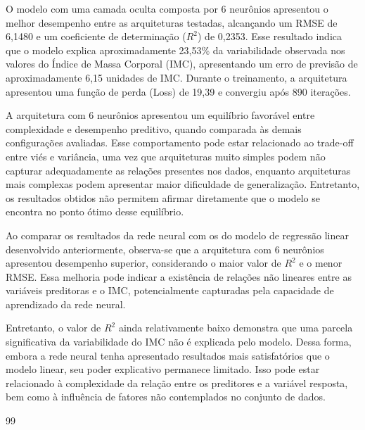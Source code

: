 \documentclass[conference]{IEEEtran}
\begin{document}
O modelo com uma camada oculta composta por 6 neurônios apresentou o melhor desempenho entre as arquiteturas testadas, alcançando um RMSE de 6,1480 e um coeficiente de determinação ($R^2$) de 0,2353. Esse resultado indica que o modelo explica aproximadamente 23,53\% da variabilidade observada nos valores do Índice de Massa Corporal (IMC), apresentando um erro de previsão de aproximadamente 6,15 unidades de IMC. Durante o treinamento, a arquitetura apresentou uma função de perda (Loss) de 19,39 e convergiu após 890 iterações.

A arquitetura com 6 neurônios apresentou um equilíbrio favorável entre complexidade e desempenho preditivo, quando comparada às demais configurações avaliadas. Esse comportamento pode estar relacionado ao trade-off entre viés e variância, uma vez que arquiteturas muito simples podem não capturar adequadamente as relações presentes nos dados, enquanto arquiteturas mais complexas podem apresentar maior dificuldade de generalização. Entretanto, os resultados obtidos não permitem afirmar diretamente que o modelo se encontra no ponto ótimo desse equilíbrio.

Ao comparar os resultados da rede neural com os do modelo de regressão linear desenvolvido anteriormente, observa-se que a arquitetura com 6 neurônios apresentou desempenho superior, considerando o maior valor de $R^2$ e o menor RMSE. Essa melhoria pode indicar a existência de relações não lineares entre as variáveis preditoras e o IMC, potencialmente capturadas pela capacidade de aprendizado da rede neural.

Entretanto, o valor de $R^2$ ainda relativamente baixo demonstra que uma parcela significativa da variabilidade do IMC não é explicada pelo modelo. Dessa forma, embora a rede neural tenha apresentado resultados mais satisfatórios que o modelo linear, seu poder explicativo permanece limitado. Isso pode estar relacionado à complexidade da relação entre os preditores e a variável resposta, bem como à influência de fatores não contemplados no conjunto de dados.
\begin{thebibliography}{99}

\end{thebibliography}

\vspace{12pt}
\end{document}
